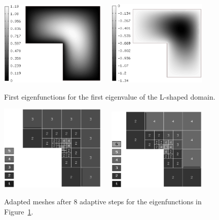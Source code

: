 \documentclass[smallextended]{svjour3}
\begin{document}
\begin{figure}[!ht]
\begin{center}
\includegraphics[width=0.45\textwidth]{lshape1.eps}\ \ \ 
\includegraphics[width=0.42\textwidth]{lshape2.eps}
\end{center}
\caption{First eigenfunctions for the first eigenvalue of the L-shaped domain.}
\label{fig:l_sh_eig1}
\end{figure}

\begin{figure}[!ht]
\begin{center}
\includegraphics[width=0.45\textwidth]{lshape3.eps}\ \ \ 
\includegraphics[width=0.42\textwidth]{lshape4.eps}
\end{center}
\caption{Adapted meshes after 8 adaptive steps for the eigenfunctions in Figure~\ref{fig:l_sh_eig1}.}
\label{fig:l_sh_eig2}
\end{figure}
\end{document}
